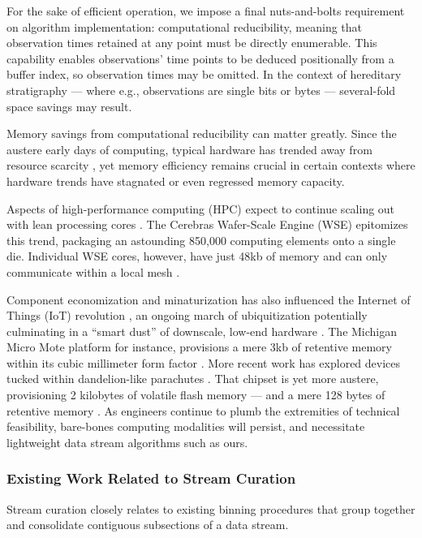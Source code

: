 For the sake of efficient operation, we impose a final nuts-and-bolts requirement on algorithm implementation: computational reducibility, meaning that observation times retained at any point must be directly enumerable.
This capability enables observations' time points to be deduced positionally from a buffer index, so observation times may be omitted.
In the context of hereditary stratigraphy --- where e.g., observations are single bits or bytes --- several-fold space savings may result.

Memory savings from computational reducibility can matter greatly.
Since the austere early days of computing, typical hardware has trended away from resource scarcity \citep{kushida2015cloud}, yet memory efficiency remains crucial in certain contexts where hardware trends have stagnated or even regressed memory capacity.

Aspects of high-performance computing (HPC) expect to continue scaling out with lean processing cores \citep{sutter2005free,morgenstern2021unparalleled}.
The Cerebras Wafer-Scale Engine (WSE) epitomizes this trend, packaging an astounding 850,000 computing elements onto a single die.
Individual WSE cores, however, have just 48kb of memory and can only communicate within a local mesh \citep{cerebras2021wafer,lauterbach2021path}.

Component economization and minaturization has also influenced the Internet of Things (IoT) revolution \citep{rfc7228,ojo2018review}, an ongoing march of ubiquitization potentially culminating in a ``smart dust'' of downscale, low-end hardware \citep{warneke2001smart}.
The Michigan Micro Mote platform for instance, provisions a mere 3kb of retentive memory within its cubic millimeter form factor \citep{lee2012modular}.
More recent work has explored devices tucked within dandelion-like parachutes \citep{iyer2022wind}.
That chipset is yet more austere, provisioning 2 kilobytes of volatile flash memory --- and a mere 128 bytes of retentive memory \citep{microchip2014atiny20}.
As engineers continue to plumb the extremities of technical feasibility, bare-bones computing modalities will persist, and necessitate lightweight data stream algorithms such as ours.

\subsubsection{Existing Work Related to Stream Curation}

Stream curation closely relates to existing binning procedures that group together and consolidate contiguous subsections of a data stream.

